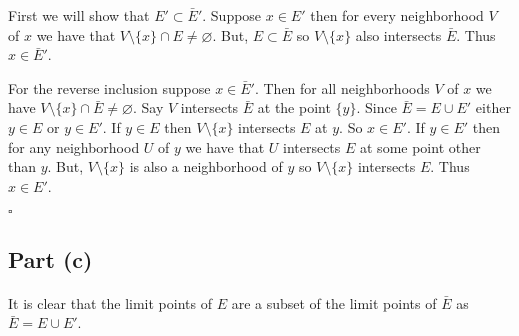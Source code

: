 \documentclass[11pt, oneside]{article}   	%
\newcommand{\tor}{\text{ or }}
\newcommand{\qed}{\begin{center}
$\square$
\end{center}}
\begin{document}
First we will show that $E' \subset \bar{E}'$. Suppose $x \in E'$ then for every neighborhood $V$ of $x$ we have that $V \setminus \{x\} \cap E \neq \varnothing$. But, $E \subset \bar{E}$ so $V \setminus \{x\}$ also intersects $\bar{E}$. Thus $x \in \bar{E}'$.

For the reverse inclusion suppose $x \in \bar{E}'$. Then for all neighborhoods $V$ of $x$ we have  $V \setminus \{x\} \cap \bar{E} \neq \varnothing$. Say $V$ intersects $\bar{E}$ at the point $\{y\}$. Since $\bar{E} = E \cup E'$ either $y \in E \tor y \in E'$. If $y \in E$ then $V \setminus \{x\} $ intersects $E$ at $y$. So $x \in E'$. If $y \in E'$ then for any neighborhood $U$ of $y$ we have that $U$ intersects $E$ at some point other than $y$. But, $V \setminus \{x\}$ is also a neighborhood of  $y$ so $V \setminus \{x\}$ intersects $E$. Thus $x \in E'$. \qed

\subsection*{Part (c)}
\paragraph{}

It is clear that the limit points of $E$ are a subset of the limit points of $\bar{E}$ as $\bar{E} = E \cup E'$. 



































 
\end{document}
